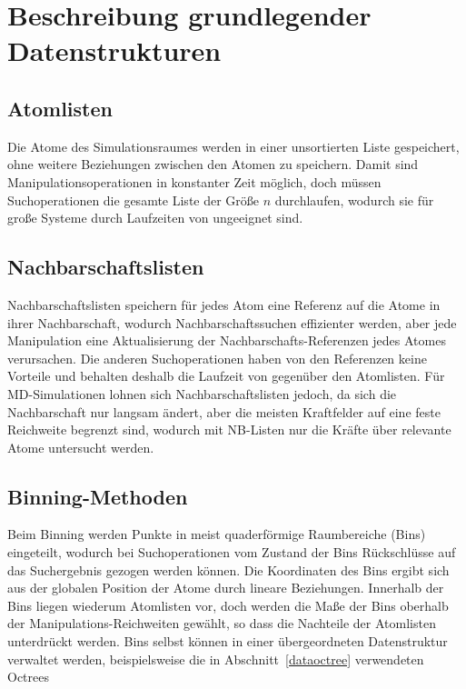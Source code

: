 \section{Beschreibung grundlegender Datenstrukturen}
\label{appendix_dataoverview}

\subsection{Atomlisten}

Die Atome des Simulationsraumes werden in einer unsortierten Liste gespeichert, ohne weitere Beziehungen zwischen den Atomen zu speichern.
Damit sind Manipulationsoperationen in konstanter Zeit  möglich, doch müssen Suchoperationen die gesamte Liste der Größe $n$ durchlaufen, wodurch sie für große Systeme durch Laufzeiten von  ungeeignet sind.

\subsection{Nachbarschaftslisten}

Nachbarschaftslisten speichern für jedes Atom eine Referenz auf die Atome in ihrer Nachbarschaft, wodurch Nachbarschaftssuchen effizienter werden, aber jede Manipulation eine Aktualisierung der Nachbarschafts-Referenzen jedes Atomes verursachen.
Die anderen Suchoperationen haben von den Referenzen keine Vorteile und behalten deshalb die Laufzeit von  gegenüber den Atomlisten.
Für MD-Simulationen lohnen sich Nachbarschaftslisten jedoch, da sich die Nachbarschaft nur langsam ändert, aber die meisten Kraftfelder auf eine feste Reichweite begrenzt sind, wodurch mit NB-Listen nur die Kräfte über relevante Atome untersucht werden.

\subsection{Binning-Methoden}
Beim Binning werden Punkte in meist quaderförmige Raumbereiche (Bins) eingeteilt, wodurch bei Suchoperationen vom Zustand der Bins Rückschlüsse auf das Suchergebnis gezogen werden können.
Die Koordinaten des Bins ergibt sich aus der globalen Position der Atome durch lineare Beziehungen.
Innerhalb der Bins liegen wiederum Atomlisten vor, doch werden die Maße der Bins oberhalb der Manipulations-Reichweiten gewählt, so dass die Nachteile der Atomlisten unterdrückt werden.
Bins selbst können in einer übergeordneten Datenstruktur verwaltet werden, beispielsweise die in Abschnitt~\ref{dataoctree} verwendeten Octrees

